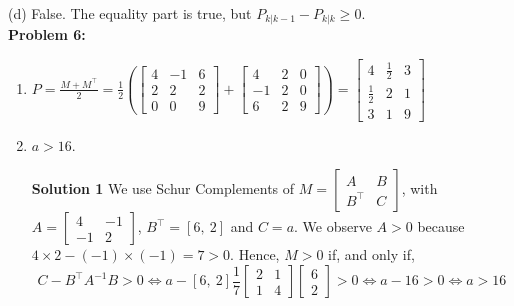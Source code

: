 \documentclass[letterpaper]{article}
\begin{document}
(d) False. The equality part is true, but $P_{k|k-1} - P_{k|k} \geq 0$.\\


\newpage
\noindent \textbf{Problem 6:} \\
\begin{enumerate}
 \setlength{\itemsep}{.15in}
    \renewcommand{\labelenumi}{(\alph{enumi})}
    \setlength{\itemsep}{.1in}
    \item $P=\frac{M+M^\top}{2}= \frac{1}{2}\left( \left[  \begin{array}{rrr} 4 & -1 & 6 \\ 2 & 2 &2\\0 & 0 & 9\end{array} \right] + \left[  \begin{array}{rrr} 4 & 2 & 0\\ -1 & 2 &0\\6 & 2 & 9\end{array} \right]  \right) = \left[  \begin{array}{rrr} 4 & \frac{1}{2} & 3 \\ \frac{1}{2} & 2 &1\\3 & 1 & 9\end{array} \right]$

    \item $a> 16$.

    \noindent \textbf{Solution 1} We use Schur Complements of $M=\left[  \begin{array}{ll} A & B  \\ B^\top & C \end{array} \right]$, with  $A=\left[  \begin{array}{rr} 4 & -1  \\ -1& 2 \end{array} \right]$, $B^\top=[6, ~2]$ and $C=a$. We observe $A>0$ because $4 \times 2 - (-1)\times (-1) = 7>0$. Hence,  $M>0$ if, and only if,
        $$C-B^\top A^{-1} B>0 \Leftrightarrow a - [6, ~2] \frac{1}{7} \left[  \begin{array}{rr} 2 & 1  \\ 1& 4 \end{array} \right] \left[  \begin{array}{r} 6 \\ 2 \end{array} \right] >0 \Leftrightarrow a-16>0 \Leftrightarrow a > 16$$


\end{enumerate}
\end{document}
